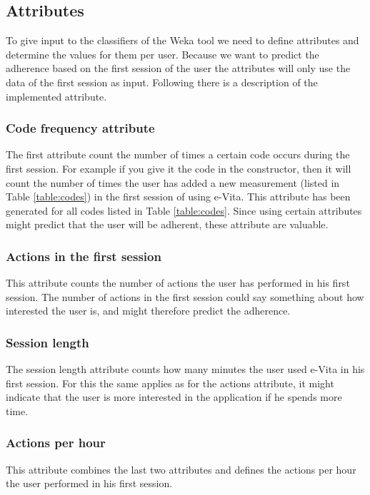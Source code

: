 \subsection{Attributes} \label{subsection:attributes}
To give input to the classifiers of the Weka tool we need to define attributes and determine the values for them per user. Because we want to predict the adherence based on the first session of the user the attributes will only use the data of the first session as input. Following there is a description of the implemented attribute.

\subsubsection{Code frequency attribute}
The first attribute count the number of times a certain code occurs during the first session. For example if you give it the code  in the constructor, then it will count the number of times the user has added a new measurement (listed in Table \ref{table:codes}) in the first session of using e-Vita. This attribute has been generated for all codes listed in Table \ref{table:codes}. Since using certain attributes might predict that the user will be adherent, these attribute are valuable.

\subsubsection{Actions in the first session}
This attribute counts the number of actions the user has performed in his first session. The number of actions in the first session could say something about how interested the user is, and might therefore predict the adherence.

\subsubsection{Session length}
The session length attribute counts how many minutes the user used e-Vita in his first session. For this the same applies as for the actions attribute, it might indicate that the user is more interested in the application if he spends more time.

\subsubsection{Actions per hour}
This attribute combines the last two attributes and defines the actions per hour the user performed in his first session.

